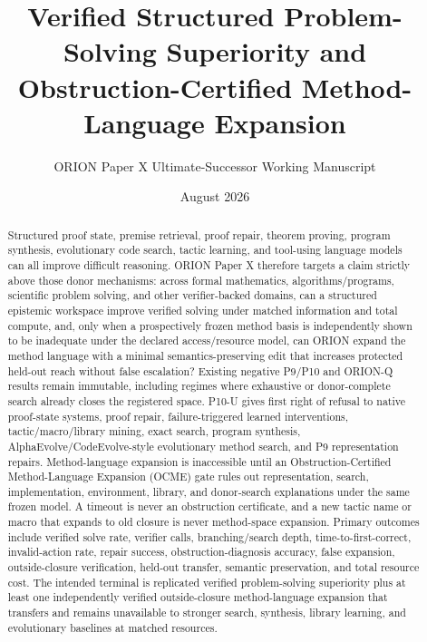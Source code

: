 \documentclass[11pt]{article}
\title{Verified Structured Problem-Solving Superiority and Obstruction-Certified Method-Language Expansion}
\author{ORION Paper X Ultimate-Successor Working Manuscript}
\date{August 2026}
\begin{document}
\maketitle

\begin{abstract}
Structured proof state, premise retrieval, proof repair, theorem proving, program synthesis, evolutionary code search, tactic learning, and tool-using language models can all improve difficult reasoning. ORION Paper X therefore targets a claim strictly above those donor mechanisms: across formal mathematics, algorithms/programs, scientific problem solving, and other verifier-backed domains, can a structured epistemic workspace improve verified solving under matched information and total compute, and, only when a prospectively frozen method basis is independently shown to be inadequate under the declared access/resource model, can ORION expand the method language with a minimal semantics-preserving edit that increases protected held-out reach without false escalation? Existing negative P9/P10 and ORION-Q results remain immutable, including regimes where exhaustive or donor-complete search already closes the registered space. P10-U gives first right of refusal to native proof-state systems, proof repair, failure-triggered learned interventions, tactic/macro/library mining, exact search, program synthesis, AlphaEvolve/CodeEvolve-style evolutionary method search, and P9 representation repairs. Method-language expansion is inaccessible until an Obstruction-Certified Method-Language Expansion (OCME) gate rules out representation, search, implementation, environment, library, and donor-search explanations under the same frozen model. A timeout is never an obstruction certificate, and a new tactic name or macro that expands to old closure is never method-space expansion. Primary outcomes include verified solve rate, verifier calls, branching/search depth, time-to-first-correct, invalid-action rate, repair success, obstruction-diagnosis accuracy, false expansion, outside-closure verification, held-out transfer, semantic preservation, and total resource cost. The intended terminal is replicated verified problem-solving superiority plus at least one independently verified outside-closure method-language expansion that transfers and remains unavailable to stronger search, synthesis, library learning, and evolutionary baselines at matched resources.
\end{abstract}
\end{document}
